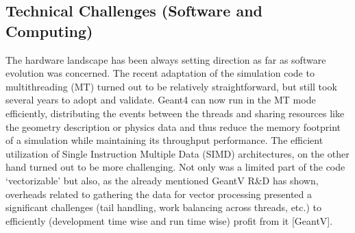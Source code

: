 \documentclass[11pt,a4paper]{article}
\begin{document}
\hypertarget{technical-challenges-software-and-computing-1}{%
\subsection{Technical Challenges (Software and
Computing)}\label{technical-challenges-software-and-computing-1}}

The hardware landscape has been always setting direction as far as
software evolution was concerned. The recent adaptation of the
simulation code to multithreading (MT) turned out to be relatively
straightforward, but still took several years to adopt and validate.
Geant4 can now run in the MT mode efficiently, distributing the events
between the threads and sharing resources like the geometry description
or physics data and thus reduce the memory footprint of a simulation
while maintaining its throughput performance. The efficient utilization
of Single Instruction Multiple Data (SIMD) architectures, on the other
hand turned out to be more challenging. Not only was a limited part of
the code `vectorizable' but also, as the already mentioned GeantV R\&D
has shown, overheads related to gathering the data for vector processing
presented a significant challenges (tail handling, work balancing across
threads, etc.) to efficiently (development time wise and run time wise)
profit from it {[}GeantV{]}.
\end{document}

